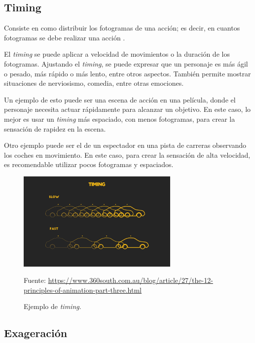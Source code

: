 \documentclass{article}
\begin{document}
\subsection{Timing}

Consiste en como distribuir los fotogramas de una acción; es decir, en cuantos fotogramas se debe realizar una acción \cite{idearocket}.

\bigskip

El \textit{timing} se puede aplicar a velocidad de movimientos o la duración de los fotogramas. Ajustando el \textit{timing}, se puede expresar que un personaje es más ágil o pesado, más rápido o más lento, entre otros aspectos. También permite mostrar situaciones de nerviosismo, comedia, entre otras emociones.

\bigskip

Un ejemplo de esto puede ser una escena de acción en una película, donde el personaje necesita actuar rápidamente para alcanzar un objetivo. En este caso, lo mejor es usar un \textit{timing} más espaciado, con menos fotogramas, para crear la sensación de rapidez en la escena. 

Otro ejemplo puede ser el de un espectador en una pista de carreras observando los coches en movimiento. En este caso, para crear la sensación de alta velocidad, es recomendable utilizar pocos fotogramas y espaciados.

\begin{figure}[H]
    \centering
    \includegraphics[width=0.7\textwidth]{imagenes/image-9_timing.jpg}
    \caption{Ejemplo de \textit{timing}.}
    \vspace{10pt}
    \footnotesize{Fuente: \url{https://www.360south.com.au/blog/article/27/the-12-principles-of-animation-part-three.html}}
\end{figure}

\subsection{Exageración}
\end{document}
